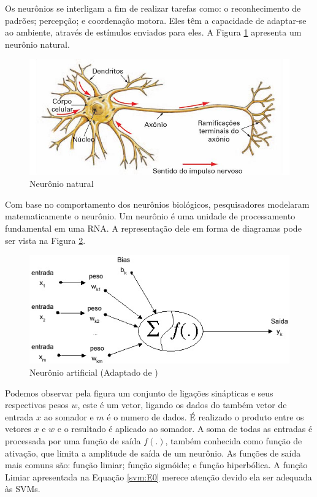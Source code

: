 Os neurônios se interligam a fim de realizar tarefas como: o reconhecimento de padrões; percepção; e coordenação motora. Eles têm a capacidade de adaptar-se ao ambiente, através de estímulos enviados para eles. A Figura \ref{fig:neuronio-nat} apresenta um neurônio natural.

\begin{figure}[htb]
	\centering
	\includegraphics[scale=0.5]{./figuras/neuronio-nat.jpg}
	\caption{Neurônio natural}
	\label{fig:neuronio-nat}
\end{figure}

Com base no comportamento dos neurônios biológicos, pesquisadores modelaram matematicamente o neurônio. Um neurônio é uma unidade de processamento fundamental em uma RNA. A representação dele em forma de diagramas pode ser vista na Figura \ref{fig:neuronio_artificial}.

\begin{figure}[htb]
	\centering
	\includegraphics[scale=0.8]{./figuras/neuronio_artificial.jpg}
	\caption{Neurônio artificial (Adaptado de \cite{Haykin99})}
	\label{fig:neuronio_artificial}
\end{figure}

Podemos observar pela figura um conjunto de ligações sinápticas e seus respectivos pesos $w$, este é um vetor, ligando os dados do também vetor de entrada $x$ ao somador e $m$ é o numero de dados. É realizado o produto entre os vetores $x$ e $w$ e o resultado é aplicado ao somador. A soma de todas as entradas é processada por uma função de saída $f(.)$, também conhecida como função de ativação, que limita a amplitude de saída de um neurônio. As funções de saída mais comuns são: função limiar; função sigmóide; e função hiperbólica. A função Limiar apresentada na Equação \ref{svm:E0} merece atenção devido ela ser adequada às SVMs.


